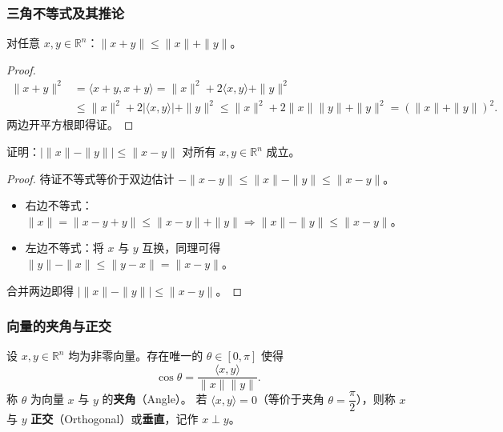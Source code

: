 \documentclass[lang=cn,11pt]{elegantbook}
\begin{document}
\subsubsection{三角不等式及其推论}

\begin{theorem} \label{thm:triangle-ineq}
对任意 $x,y\in\mathbb R^n$：$\|x+y\|\leq\|x\|+\|y\|$。
\end{theorem}

\begin{proof}
\begin{align*}
\|x+y\|^2 &= \langle x+y,x+y\rangle = \|x\|^2+2\langle x,y\rangle+\|y\|^2 \\
&\leqslant  \|x\|^2+2|\langle x,y\rangle|+\|y\|^2 \leqslant  \|x\|^2+2\|x\|\|y\|+\|y\|^2 = (\|x\|+\|y\|)^2 .
\end{align*}
两边开平方根即得证。
\end{proof}

\begin{exercise} \label{ex:norm-reverse-triangle}
证明：$\bigl|\|x\|-\|y\|\bigr|\leq\|x-y\|$ 对所有 $x,y\in\mathbb R^n$ 成立。
\end{exercise}
\begin{proof}
待证不等式等价于双边估计 $-\|x-y\|\leq\|x\|-\|y\|\leq\|x-y\|$。
\begin{itemize}
\item 右边不等式：$\|x\|=\|x-y+y\|\leq\|x-y\|+\|y\| \Longrightarrow \|x\|-\|y\|\leq\|x-y\|$。
\item 左边不等式：将 $x$ 与 $y$ 互换，同理可得 $\|y\|-\|x\|\leq\|y-x\|=\|x-y\|$。
\end{itemize}
合并两边即得 $\bigl|\|x\|-\|y\|\bigr|\leq\|x-y\|$。
\end{proof}

\subsubsection*{向量的夹角与正交}

\begin{definition}[向量夹角与正交] \label{def:vector-angle} \label{def:orthogonal}
设 $x,y\in\mathbb R^n$ 均为非零向量。存在唯一的 $\theta\in[0,\pi]$ 使得
\[
\cos\theta=\frac{\langle x,y\rangle}{\|x\|\|y\|}.
\]
称 $\theta$ 为向量 $x$ 与 $y$ 的\textbf{夹角}（Angle）。
若 $\langle x,y\rangle=0$（等价于夹角 $\theta=\dfrac{\pi}{2}$），则称 $x$ 与 $y$ \textbf{正交}（Orthogonal）或\textbf{垂直}，记作 $x\perp y$。
\end{definition}
\end{document}
